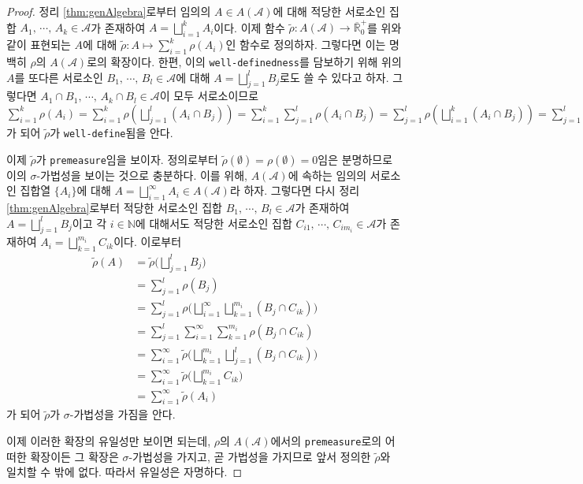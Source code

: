 \begin{proof}
    정리 \ref{thm:genAlgebra}로부터 임의의 $A\in A(\mathcal{A})$에 대해 적당한 서로소인 집합 $A_1,\,\cdots,\,A_k\in\mathcal{A}$가 존재하여 $A=\bigsqcup_{i=1}^kA_i$이다. 이제 함수 $\widetilde{\rho}:A(\mathcal{A})\to\overline{\mathbb{R}}^+_0$를 위와 같이 표현되는 $A$에 대해 $\widetilde{\rho}:A\mapsto\sum_{i=1}^k\rho(A_i)$인 함수로 정의하자. 그렇다면 이는 명백히 $\rho$의 $A(\mathcal{A})$로의 확장이다. 한편, 이의 \texttt{well-definedness}를 담보하기 위해 위의 $A$를 또다른 서로소인 $B_1,\,\cdots,\,B_l\in\mathcal{A}$에 대해 $A=\bigsqcup_{j=1}^lB_j$로도 쓸 수 있다고 하자. 그렇다면 $A_1\cap B_1,\,\cdots,\,A_k\cap B_l\in\mathcal{A}$이 모두 서로소이므로 $\sum_{i=1}^k\rho(A_i)=\sum_{i=1}^k\rho(\bigsqcup_{j=1}^l(A_i\cap B_j))=\sum_{i=1}^k\sum_{j=1}^l\rho(A_i\cap B_j)=\sum_{j=1}^l\rho(\bigsqcup_{i=1}^k(A_i\cap B_j))=\sum_{j=1}^l\rho(B_j)$가 되어 $\widetilde{\rho}$가 \texttt{well-define}됨을 안다.

    이제 $\widetilde{\rho}$가 \texttt{premeasure}임을 보이자. 정의로부터 $\widetilde{\rho}(\emptyset)=\rho(\emptyset)=0$임은 분명하므로 이의 $\sigma$-가법성을 보이는 것으로 충분하다. 이를 위해, $A(\mathcal{A})$에 속하는 임의의 서로소인 집합열 $\{A_i\}$에 대해 $A=\bigsqcup_{i=1}^\infty A_i\in A(\mathcal{A})$라 하자. 그렇다면 다시 정리 \ref{thm:genAlgebra}로부터 적당한 서로소인 집합 $B_1,\,\cdots,\,B_l\in\mathcal{A}$가 존재하여 $A=\bigsqcup_{j=1}^lB_j$이고 각 $i\in\mathbb{N}$에 대해서도 적당한 서로소인 집합 $C_{i1},\,\cdots,\,C_{im_i}\in\mathcal{A}$가 존재하여 $A_i=\bigsqcup_{k=1}^{m_i}C_{ik}$이다. 이로부터
    \begin{align*}
        \widetilde{\rho}(A)&=\widetilde{\rho}\bigg(\bigsqcup_{j=1}^lB_j\bigg)\\
        &=\sum_{j=1}^l\rho(B_j)\\
        &=\sum_{j=1}^l\rho\bigg(\bigsqcup_{i=1}^\infty\bigsqcup_{k=1}^{m_i}(B_j\cap C_{ik})\bigg)\\
        &=\sum_{j=1}^l\sum_{i=1}^\infty\sum_{k=1}^{m_i}\rho(B_j\cap C_{ik})\\
        &=\sum_{i=1}^\infty\widetilde{\rho}\bigg(\bigsqcup_{k=1}^{m_i}\bigsqcup_{j=1}^l(B_j\cap C_{ik})\bigg)\\
        &=\sum_{i=1}^\infty\widetilde{\rho}\bigg(\bigsqcup_{k=1}^{m_i}C_{ik}\bigg)\\
        &=\sum_{i=1}^\infty\widetilde{\rho}(A_i)
    \end{align*}
    가 되어 $\widetilde{\rho}$가 $\sigma$-가법성을 가짐을 안다.

    이제 이러한 확장의 유일성만 보이면 되는데,  $\rho$의 $A(\mathcal{A})$에서의 \texttt{premeasure}로의 어떠한 확장이든 그 확장은 $\sigma$-가법성을 가지고, 곧 가법성을 가지므로 앞서 정의한  $\widetilde{\rho}$와 일치할 수 밖에 없다. 따라서 유일성은 자명하다.
\end{proof}

